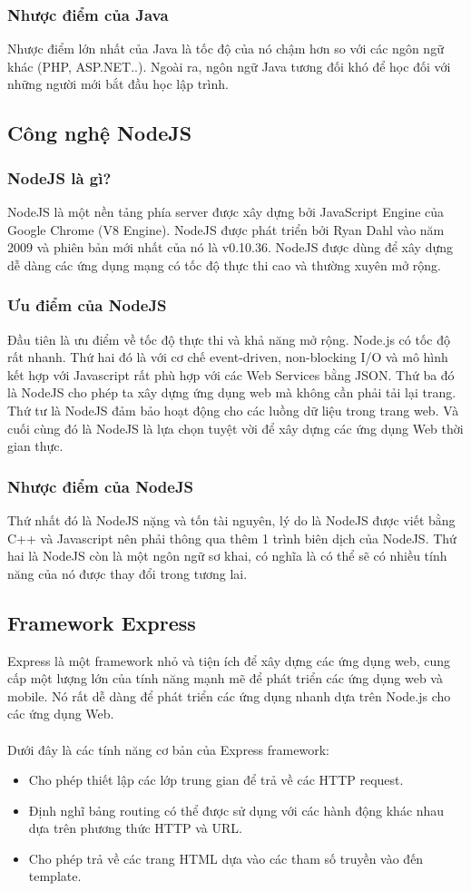 \documentclass[a4paper]{article}
\begin{document}
\subsubsection{Nhược điểm của Java}
Nhược điểm lớn nhất của Java là tốc độ của nó chậm hơn so với các ngôn ngữ khác (PHP, ASP.NET..). Ngoài ra, ngôn ngữ Java tương đối khó để học đối với những người mới bắt đầu học lập trình.
\subsection{Công nghệ NodeJS}
\subsubsection{NodeJS là gì?}
NodeJS là một nền tảng phía server được xây dựng bởi JavaScript Engine của Google Chrome (V8 Engine). NodeJS được phát triển bởi Ryan Dahl vào năm 2009 và phiên bản mới nhất của nó là v0.10.36. NodeJS được dùng để xây dựng dễ dàng các ứng dụng mạng có tốc độ thực thi cao và thường xuyên mở rộng.
\subsubsection{Ưu điểm của NodeJS}
Đầu tiên là ưu điểm về tốc độ thực thi và khả năng mở rộng. Node.js có tốc độ rất nhanh. Thứ hai đó là với cơ chế event-driven, non-blocking I/O và mô hình kết hợp với Javascript rất phù hợp với các Web Services bằng JSON. Thứ ba đó là NodeJS cho phép ta xây dựng ứng dụng web mà không cần phải tải lại trang. Thứ tư là NodeJS đảm bảo hoạt động cho các luồng dữ liệu trong trang web. Và cuối cùng đó là NodeJS là lựa chọn tuyệt vời để xây dựng các ứng dụng Web thời gian thực. 
\subsubsection{Nhược điểm của NodeJS}
Thứ nhất đó là NodeJS nặng và tốn tài nguyên, lý do là NodeJS được viết bằng C++ và Javascript nên phải thông qua thêm 1 trình biên dịch của NodeJS. Thứ hai là NodeJS còn là một ngôn ngữ sơ khai, có nghĩa là có thể sẽ có nhiều tính năng của nó được thay đổi trong tương lai.
\subsection{Framework Express}
Express là một framework nhỏ và tiện ích để xây dựng các ứng dụng web, cung cấp một lượng lớn của tính năng mạnh mẽ để phát triển các ứng dụng web và mobile. Nó rất dễ dàng để phát triển các ứng dụng nhanh dựa trên Node.js cho các ứng dụng Web.\\
\\
Dưới đây là các tính năng cơ bản của Express framework:
\begin{itemize}    
    \item Cho phép thiết lập các lớp trung gian để trả về các HTTP request.
    \item Định nghĩ bảng routing có thể được sử dụng với các hành động khác nhau dựa trên phương thức HTTP và URL.
    \item Cho phép trả về các trang HTML dựa vào các tham số truyền vào đến template.
\end{itemize} 
\end{document}
